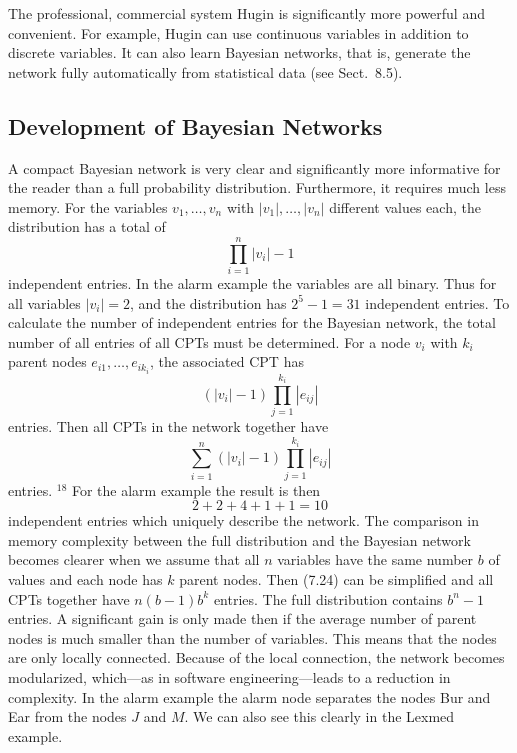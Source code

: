 \documentclass[10pt]{book}
\begin{document}
The professional, commercial system Hugin is significantly more powerful and convenient. For example, Hugin can use continuous variables in addition to discrete variables. It can also learn Bayesian networks, that is, generate the network fully automatically from statistical data (see Sect.~8.5).

\subsection{Development of Bayesian Networks}
A compact Bayesian network is very clear and significantly more informative for the reader than a full probability distribution. Furthermore, it requires much less memory. For the variables $v_{1}, \ldots, v_{n}$ with $\left|v_{1}\right|, \ldots,\left|v_{n}\right|$ different values each, the distribution has a total of
\[
\prod_{i=1}^{n}\left|v_{i}\right|-1
\]
independent entries. In the alarm example the variables are all binary. Thus for all variables $\left|v_{i}\right|=2$, and the distribution has $2^{5}-1=31$ independent entries. To calculate the number of independent entries for the Bayesian network, the total number of all entries of all CPTs must be determined. For a node $v_{i}$ with $k_{i}$ parent nodes $e_{i 1}, \ldots, e_{i k_{i}}$, the associated CPT has
\[
\left(\left|v_{i}\right|-1\right) \prod_{j=1}^{k_{i}}\left|e_{i j}\right|
\]
entries. Then all CPTs in the network together have
\begin{equation*}
\sum_{i=1}^{n}\left(\left|v_{i}\right|-1\right) \prod_{j=1}^{k_{i}}\left|e_{i j}\right| \tag{7.24}
\end{equation*}
entries. ${ }^{18}$ For the alarm example the result is then
\[
2+2+4+1+1=10
\]
independent entries which uniquely describe the network. The comparison in memory complexity between the full distribution and the Bayesian network becomes clearer when we assume that all $n$ variables have the same number $b$ of values and each node has $k$ parent nodes. Then (7.24) can be simplified and all CPTs together have $n(b-1) b^{k}$ entries. The full distribution contains $b^{n}-1$ entries. A significant gain is only made then if the average number of parent nodes is much smaller than the number of variables. This means that the nodes are only locally connected. Because of the local connection, the network becomes modularized, which---as in software engineering---leads to a reduction in complexity. In the alarm example the alarm node separates the nodes Bur and Ear from the nodes $J$ and $M$. We can also see this clearly in the Lexmed example.
\end{document}
